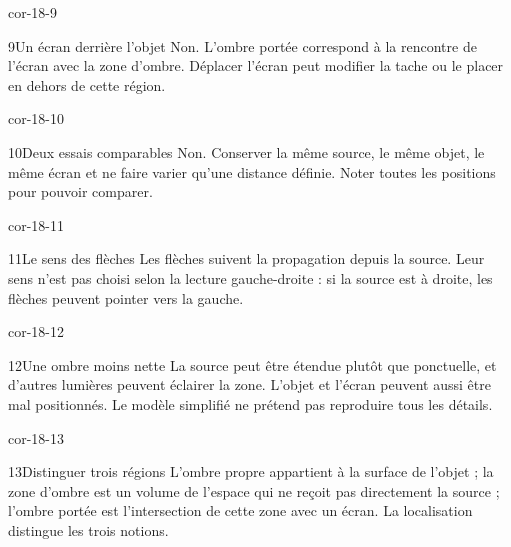 \documentclass[12pt,twoside,openany]{book}
\begin{document}
\begin{blocLivre}{cor-18-9}
\begin{corrige}{9}{Un écran derrière l’objet}
Non. L’ombre portée correspond à la rencontre de l’écran avec la zone d’ombre. Déplacer l’écran peut modifier la tache ou le placer en dehors de cette région.\par
\end{corrige}\end{blocLivre}
\begin{blocLivre}{cor-18-10}
\begin{corrige}{10}{Deux essais comparables}
Non. Conserver la même source, le même objet, le même écran et ne faire varier qu’une distance définie. Noter toutes les positions pour pouvoir comparer.\par
\end{corrige}\end{blocLivre}
\begin{blocLivre}{cor-18-11}
\begin{corrige}{11}{Le sens des flèches}
Les flèches suivent la propagation depuis la source. Leur sens n’est pas choisi selon la lecture gauche-droite : si la source est à droite, les flèches peuvent pointer vers la gauche.\par
\end{corrige}\end{blocLivre}
\begin{blocLivre}{cor-18-12}
\begin{corrige}{12}{Une ombre moins nette}
La source peut être étendue plutôt que ponctuelle, et d’autres lumières peuvent éclairer la zone. L’objet et l’écran peuvent aussi être mal positionnés. Le modèle simplifié ne prétend pas reproduire tous les détails.\par
\end{corrige}\end{blocLivre}
\begin{blocLivre}{cor-18-13}
\begin{corrige}{13}{Distinguer trois régions}
L’ombre propre appartient à la surface de l’objet ; la zone d’ombre est un volume de l’espace qui ne reçoit pas directement la source ; l’ombre portée est l’intersection de cette zone avec un écran. La localisation distingue les trois notions.\par
{}
\end{corrige}\end{blocLivre}
\end{document}
